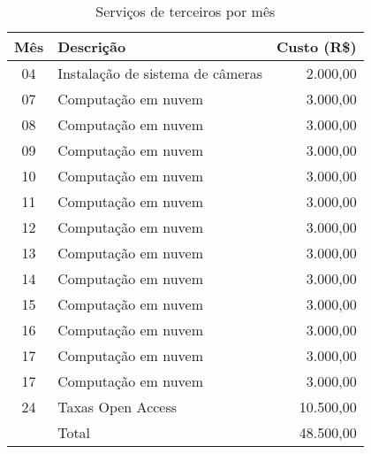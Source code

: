 \begin{table}[!h]
\centering
	\caption{Serviços de terceiros por mês}
\begin{tabular}{clr}
\toprule
	Mês   & Descrição & Custo (R\$) \\
	\midrule
	04    & Instalação de sistema de câmeras   & 2.000,00 \\
	07    & Computação em nuvem                & 3.000,00 \\
	08    & Computação em nuvem                & 3.000,00 \\
	09    & Computação em nuvem                & 3.000,00 \\
	10    & Computação em nuvem                & 3.000,00 \\
	11    & Computação em nuvem                & 3.000,00 \\
	12    & Computação em nuvem                & 3.000,00 \\
	13    & Computação em nuvem                & 3.000,00 \\
	14    & Computação em nuvem                & 3.000,00 \\
	15    & Computação em nuvem                & 3.000,00 \\
	16    & Computação em nuvem                & 3.000,00 \\
	17    & Computação em nuvem                & 3.000,00 \\
	17    & Computação em nuvem                & 3.000,00 \\
	24    & Taxas Open Access                  &10.500,00 \\
\midrule
	      & Total                              &48.500,00 \\
\bottomrule
\end{tabular}
	\label{tab:ter}
\end{table}
\newpage

